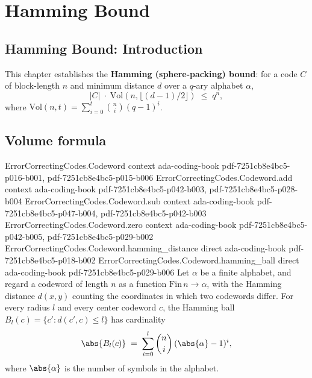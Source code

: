 \section{Hamming Bound}
\subsection*{Hamming Bound: Introduction}

This chapter establishes the \textbf{Hamming (sphere-packing) bound}: for a code $C$
of block-length $n$ and minimum distance $d$ over a $q$-ary alphabet $\alpha$,
\[
|C| \;\cdot\; \mathrm{Vol}(n,\lfloor(d-1)/2\rfloor)
\;\le\; q^n,
\]
where $\mathrm{Vol}(n,t) = \sum_{i=0}^{t}\binom{n}{i}(q-1)^i$.

\subsection{Volume formula}

\begin{theorem}
\label{ErrorCorrectingCodes.Codeword.hamming_ball_size}
\leanok
{}
\proofstep
  {ErrorCorrectingCodes.Codeword}
  {context}
  {ada-coding-book}
  {pdf-7251cb8e4bc5-p016-b001,
    pdf-7251cb8e4bc5-p015-b006}
\proofstep
  {ErrorCorrectingCodes.Codeword.add}
  {context}
  {ada-coding-book}
  {pdf-7251cb8e4bc5-p042-b003,
    pdf-7251cb8e4bc5-p028-b004}
\proofstep
  {ErrorCorrectingCodes.Codeword.sub}
  {context}
  {ada-coding-book}
  {pdf-7251cb8e4bc5-p047-b004,
    pdf-7251cb8e4bc5-p042-b003}
\proofstep
  {ErrorCorrectingCodes.Codeword.zero}
  {context}
  {ada-coding-book}
  {pdf-7251cb8e4bc5-p042-b005,
    pdf-7251cb8e4bc5-p029-b002}
\proofstep
  {ErrorCorrectingCodes.Codeword.hamming_distance}
  {direct}
  {ada-coding-book}
  {pdf-7251cb8e4bc5-p018-b002}
\proofstep
  {ErrorCorrectingCodes.Codeword.hamming_ball}
  {direct}
  {ada-coding-book}
  {pdf-7251cb8e4bc5-p029-b006}
Let $\alpha$ be a finite alphabet, and regard a codeword of length $n$ as a function
$\mathrm{Fin}\,n \to \alpha$, with the Hamming distance $d(x,y)$ counting the
coordinates in which two codewords differ. For every radius $l$ and every center
codeword $c$, the Hamming ball $B_l(c) = \{c' : d(c',c) \le l\}$ has cardinality
\[
\abs{B_l(c)} \;=\; \sum_{i=0}^{l} \binom{n}{i}\,(\abs{\alpha}-1)^{i},
\]
where $\abs{\alpha}$ is the number of symbols in the alphabet.
\end{theorem}

